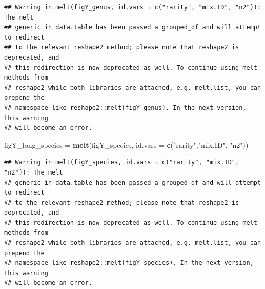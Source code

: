 \documentclass[
]{article}
\newenvironment{Shaded}{\begin{snugshade}}{\end{snugshade}}
\newcommand{\CommentTok}[1]{\textcolor[rgb]{0.56,0.35,0.01}{\textit{#1}}}
\newcommand{\DataTypeTok}[1]{\textcolor[rgb]{0.13,0.29,0.53}{#1}}
\newcommand{\KeywordTok}[1]{\textcolor[rgb]{0.13,0.29,0.53}{\textbf{#1}}}
\newcommand{\NormalTok}[1]{#1}
\newcommand{\StringTok}[1]{\textcolor[rgb]{0.31,0.60,0.02}{#1}}
\begin{document}
\begin{Shaded}
\begin{Highlighting}[]
{{{\CommentTok{#Convert from wide to long}

\CommentTok{#figY_long_family = melt(figY_family, id.vars = c("rarity","mix.ID", "n2"))}
\NormalTok{figY_long_genus =}\StringTok{ }\KeywordTok{melt}\NormalTok{(figY_genus, }\DataTypeTok{id.vars =} \KeywordTok{c}\NormalTok{(}\StringTok{"rarity"}\NormalTok{,}\StringTok{"mix.ID"}\NormalTok{, }\StringTok{"n2"}\NormalTok{))}
\end{Highlighting}
\end{Shaded}

\begin{verbatim}
## Warning in melt(figY_genus, id.vars = c("rarity", "mix.ID", "n2")): The melt
## generic in data.table has been passed a grouped_df and will attempt to redirect
## to the relevant reshape2 method; please note that reshape2 is deprecated, and
## this redirection is now deprecated as well. To continue using melt methods from
## reshape2 while both libraries are attached, e.g. melt.list, you can prepend the
## namespace like reshape2::melt(figY_genus). In the next version, this warning
## will become an error.
\end{verbatim}

\begin{Shaded}
\begin{Highlighting}[]
\NormalTok{figY_long_species =}\StringTok{ }\KeywordTok{melt}\NormalTok{(figY_species, }\DataTypeTok{id.vars =} \KeywordTok{c}\NormalTok{(}\StringTok{"rarity"}\NormalTok{,}\StringTok{"mix.ID"}\NormalTok{, }\StringTok{"n2"}\NormalTok{))}
\end{Highlighting}
\end{Shaded}

\begin{verbatim}
## Warning in melt(figY_species, id.vars = c("rarity", "mix.ID", "n2")): The melt
## generic in data.table has been passed a grouped_df and will attempt to redirect
## to the relevant reshape2 method; please note that reshape2 is deprecated, and
## this redirection is now deprecated as well. To continue using melt methods from
## reshape2 while both libraries are attached, e.g. melt.list, you can prepend the
## namespace like reshape2::melt(figY_species). In the next version, this warning
## will become an error.
\end{verbatim}
\end{document}
